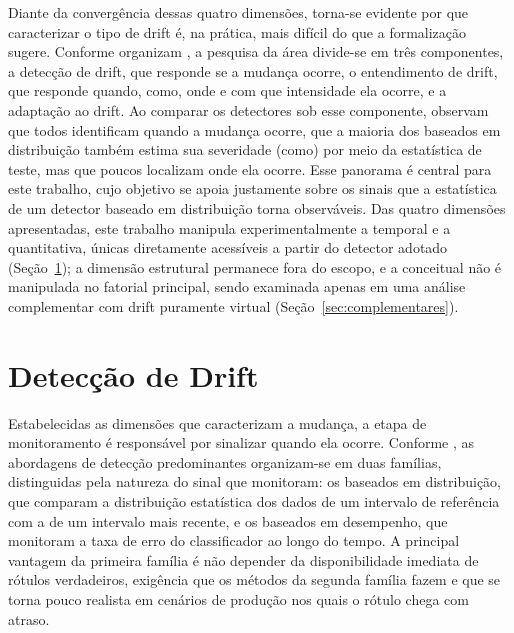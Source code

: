 Diante da convergência dessas quatro dimensões, torna-se evidente por que
caracterizar o tipo de drift é, na prática, mais difícil do que a
formalização sugere. Conforme organizam , a pesquisa da
área divide-se em três componentes, a detecção de drift, que responde se a
mudança ocorre, o entendimento de drift, que responde quando, como, onde e
com que intensidade ela ocorre, e a adaptação ao drift. Ao comparar os
detectores sob esse componente, observam que todos identificam quando a
mudança ocorre, que a maioria dos baseados em distribuição também estima sua
severidade (como) por meio da estatística de teste, mas que poucos localizam
onde ela ocorre. Esse panorama é central para este
trabalho, cujo objetivo se apoia justamente sobre os sinais que a
estatística de um detector baseado em distribuição torna observáveis. Das quatro dimensões apresentadas, este
trabalho manipula experimentalmente a temporal e a quantitativa, únicas
diretamente acessíveis a partir do detector adotado (Seção~\ref{sec:deteccao});
a dimensão estrutural permanece fora do escopo, e a conceitual não é
manipulada no fatorial principal, sendo examinada apenas em uma análise
complementar com drift puramente virtual (Seção~\ref{sec:complementares}).

\section{Detecção de Drift}
\label{sec:deteccao}
Estabelecidas as dimensões que caracterizam a mudança, a etapa de
monitoramento é responsável por sinalizar quando ela ocorre. Conforme
, as abordagens de detecção predominantes organizam-se
em duas famílias, distinguidas pela natureza do sinal que monitoram: os
baseados em distribuição, que comparam a distribuição estatística dos dados
de um intervalo de referência com a de um intervalo mais recente, e os
baseados em desempenho, que monitoram a taxa de erro do classificador ao
longo do tempo. A principal vantagem da primeira família é não depender da
disponibilidade imediata de rótulos verdadeiros, exigência que os métodos da
segunda família fazem e que se torna pouco realista em cenários de produção
nos quais o rótulo chega com atraso.

